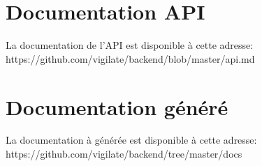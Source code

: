 \section{Documentation API}
La documentation de l'API est disponible à cette adresse: https://github.com/vigilate/backend/blob/master/api.md
\section{Documentation généré}
La documentation à générée est disponible à cette adresse: https://github.com/vigilate/backend/tree/master/docs
